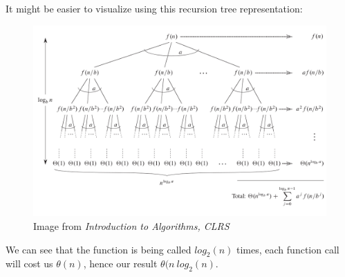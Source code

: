 \documentclass[12pt]{article}
\begin{document}
                                                                                                                                                                                                                                                                    It might be easier to visualize using this recursion tree representation:
                                                                                                                                                                                                                                                                    \begin{figure}[h]                                                                                                                                                                                                                                                                    \caption{Image from \textit{Introduction to Algorithms, CLRS}}                                                                                                                                                                                                                                                                     \includegraphics[scale=.35]{./recursion_tree_clrs.png}                                                                                                                                                                                                                                                                   
\centering
\end{figure}

We can see that the function is being called $log_2{(n)}$ times, each function call will cost us $\theta(n)$, hence our result $\theta(n\ log_2{(n)}$.
\end{document}
